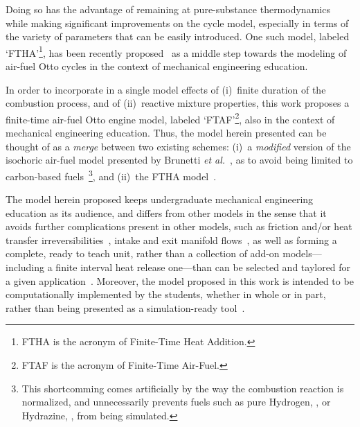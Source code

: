     Doing so has the advantage of remaining at pure-substance thermodynamics while making significant improvements on the cycle model, especially in terms of the variety of parameters that can
    be easily introduced. One such model, labeled `FTHA'\footnote{FTHA is the acronym of Finite-Time Heat Addition.}, has been recently proposed~\cite{2017-NaaktgeborenC-IntJMechEngEduc} as  a
    middle step towards the modeling of air-fuel Otto cycles in the context of mechanical engineering education.

    In order to incorporate in a single model effects of (i)~finite duration of the combustion process, and of (ii)~reactive mixture properties, this work proposes a finite-time air-fuel  Otto
    engine model, labeled `FTAF'\footnote{FTAF is the acronym of Finite-Time Air-Fuel.}, also in the context of mechanical engineering education.  Thus,  the  model  herein  presented  can  be
    thought  of  as  a   \emph{merge}   between   two   existing   schemes:   (i)~a   \emph{modified}   version   of   the   isochoric   air-fuel   model   presented   by   Brunetti   \emph{et
    al.\/}~\cite{2012-BrunettiF-Blucher}, as to avoid being limited to carbon-based fuels~\footnote{This shortcomming comes artificially by the way the combustion reaction is  normalized,  and
    unnecessarily prevents fuels such as pure Hydrogen, , or Hydrazine, , from being simulated.}, and (ii)~the FTHA model~\cite{2017-NaaktgeborenC-IntJMechEngEduc}.

    The model herein proposed keeps undergraduate mechanical engineering education as its audience, and differs from other models in the sense that it avoids further complications  present  in
    other  models,  such  as  friction  and/or  heat  transfer  irreversibilities~\cite{2008-CurtoRissoPL+HernandezAC-JApplPhys,  2002-CatonJA-IntJMechEngEduc},  intake   and   exit   manifold
    flows~\cite{2001-CatonJA-IntJMechEngEduc}, as well as forming a complete, ready to teach unit, rather than a  collection  of  add-on  models---including  a  finite  interval  heat  release
    one---than can be selected and taylored for a given application~\cite{2013-MartinsJJG-Publindustria}. Moreover,  the  model  proposed  in  this  work  is  intended  to  be  computationally
    implemented by the students, whether in whole or in part, rather than being presented as a simulation-ready tool~\cite{2011-ZuecoJ-IntJMechEngEduc}.




